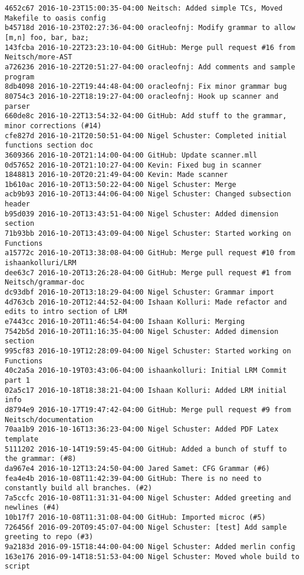 \begin{lstlisting}
4652c67 2016-10-23T15:00:35-04:00 Neitsch: Added simple TCs, Moved Makefile to oasis config
b45718d 2016-10-23T02:27:36-04:00 oracleofnj: Modify grammar to allow [m,n] foo, bar, baz;
143fcba 2016-10-22T23:23:10-04:00 GitHub: Merge pull request #16 from Neitsch/more-AST
a726236 2016-10-22T20:51:27-04:00 oracleofnj: Add comments and sample program
8db4098 2016-10-22T19:44:48-04:00 oracleofnj: Fix minor grammar bug
80754c3 2016-10-22T18:19:27-04:00 oracleofnj: Hook up scanner and parser
660de8c 2016-10-22T13:54:32-04:00 GitHub: Add stuff to the grammar, minor corrections (#14)
cfe827d 2016-10-21T20:50:51-04:00 Nigel Schuster: Completed initial functions section doc
3609366 2016-10-20T21:14:00-04:00 GitHub: Update scanner.mll
0d57652 2016-10-20T21:10:27-04:00 Kevin: Fixed bug in scanner
1848813 2016-10-20T20:21:49-04:00 Kevin: Made scanner
1b610ac 2016-10-20T13:50:22-04:00 Nigel Schuster: Merge
acb9b93 2016-10-20T13:44:06-04:00 Nigel Schuster: Changed subsection header
b95d039 2016-10-20T13:43:51-04:00 Nigel Schuster: Added dimension section
71b93bb 2016-10-20T13:43:09-04:00 Nigel Schuster: Started working on Functions
a15772c 2016-10-20T13:38:08-04:00 GitHub: Merge pull request #10 from ishaankolluri/LRM
dee63c7 2016-10-20T13:26:28-04:00 GitHub: Merge pull request #1 from Neitsch/grammar-doc
dc93dbf 2016-10-20T13:18:29-04:00 Nigel Schuster: Grammar import
4d763cb 2016-10-20T12:44:52-04:00 Ishaan Kolluri: Made refactor and edits to intro section of LRM
e7443cc 2016-10-20T11:46:54-04:00 Ishaan Kolluri: Merging
7542b5d 2016-10-20T11:16:35-04:00 Nigel Schuster: Added dimension section
995cf83 2016-10-19T12:28:09-04:00 Nigel Schuster: Started working on Functions
40c2a5a 2016-10-19T03:43:06-04:00 ishaankolluri: Initial LRM Commit part 1
02a5c17 2016-10-18T18:38:21-04:00 Ishaan Kolluri: Added LRM initial info
d8794e9 2016-10-17T19:47:42-04:00 GitHub: Merge pull request #9 from Neitsch/documentation
70aa1b9 2016-10-16T13:36:23-04:00 Nigel Schuster: Added PDF Latex template
5111202 2016-10-14T19:59:45-04:00 GitHub: Added a bunch of stuff to the grammar: (#8)
da967e4 2016-10-12T13:24:50-04:00 Jared Samet: CFG Grammar (#6)
fea4e4b 2016-10-08T11:42:39-04:00 GitHub: There is no need to constantly build all branches. (#2)
7a5ccfc 2016-10-08T11:31:31-04:00 Nigel Schuster: Added greeting and newlines (#4)
10b17f7 2016-10-08T11:31:08-04:00 GitHub: Imported microc (#5)
726456f 2016-09-20T09:45:07-04:00 Nigel Schuster: [test] Add sample greeting to repo (#3)
9a2183d 2016-09-15T18:44:00-04:00 Nigel Schuster: Added merlin config
163e176 2016-09-14T18:51:53-04:00 Nigel Schuster: Moved whole build to script

\end{lstlisting}
